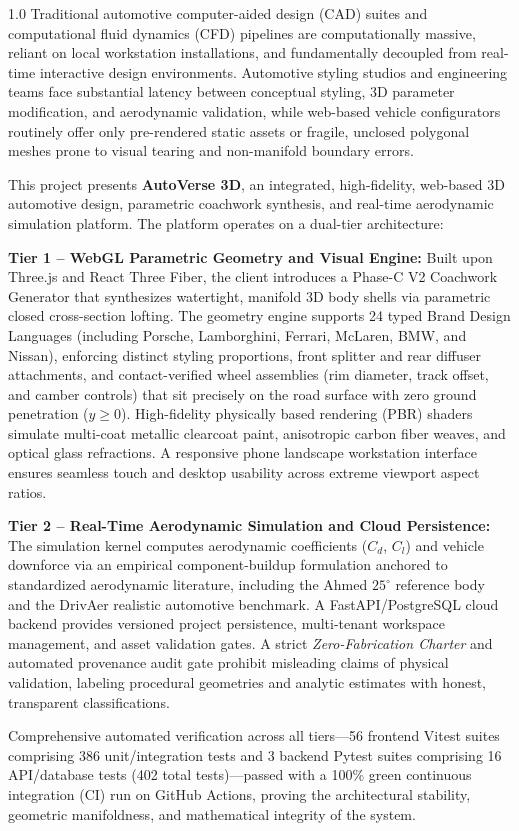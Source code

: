 \documentclass[12pt,a4paper]{report}
\begin{document}
\begin{spacing}{1.0}
Traditional automotive computer-aided design (CAD) suites and computational fluid dynamics (CFD) pipelines are computationally massive, reliant on local workstation installations, and fundamentally decoupled from real-time interactive design environments. Automotive styling studios and engineering teams face substantial latency between conceptual styling, 3D parameter modification, and aerodynamic validation, while web-based vehicle configurators routinely offer only pre-rendered static assets or fragile, unclosed polygonal meshes prone to visual tearing and non-manifold boundary errors.

This project presents \textbf{AutoVerse 3D}, an integrated, high-fidelity, web-based 3D automotive design, parametric coachwork synthesis, and real-time aerodynamic simulation platform. The platform operates on a dual-tier architecture:

\textbf{Tier 1 -- WebGL Parametric Geometry and Visual Engine:} Built upon Three.js and React Three Fiber, the client introduces a Phase-C V2 Coachwork Generator that synthesizes watertight, manifold 3D body shells via parametric closed cross-section lofting. The geometry engine supports 24 typed Brand Design Languages (including Porsche, Lamborghini, Ferrari, McLaren, BMW, and Nissan), enforcing distinct styling proportions, front splitter and rear diffuser attachments, and contact-verified wheel assemblies (rim diameter, track offset, and camber controls) that sit precisely on the road surface with zero ground penetration ($y \ge 0$). High-fidelity physically based rendering (PBR) shaders simulate multi-coat metallic clearcoat paint, anisotropic carbon fiber weaves, and optical glass refractions. A responsive phone landscape workstation interface ensures seamless touch and desktop usability across extreme viewport aspect ratios.

\textbf{Tier 2 -- Real-Time Aerodynamic Simulation and Cloud Persistence:} The simulation kernel computes aerodynamic coefficients ($C_d$, $C_l$) and vehicle downforce via an empirical component-buildup formulation anchored to standardized aerodynamic literature, including the Ahmed $25^\circ$ reference body and the DrivAer realistic automotive benchmark. A FastAPI/PostgreSQL cloud backend provides versioned project persistence, multi-tenant workspace management, and asset validation gates. A strict \textit{Zero-Fabrication Charter} and automated provenance audit gate prohibit misleading claims of physical validation, labeling procedural geometries and analytic estimates with honest, transparent classifications.

Comprehensive automated verification across all tiers---56 frontend Vitest suites comprising 386 unit/integration tests and 3 backend Pytest suites comprising 16 API/database tests (402 total tests)---passed with a 100\% green continuous integration (CI) run on GitHub Actions, proving the architectural stability, geometric manifoldness, and mathematical integrity of the system.
\end{spacing}
\end{document}

